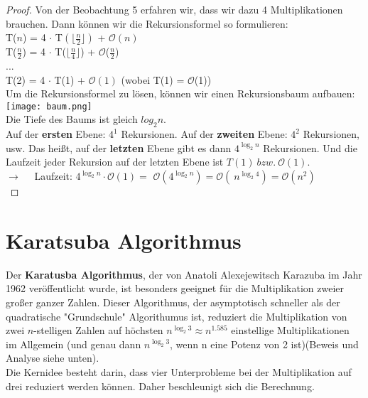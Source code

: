 \documentclass[11pt,a4paper, twoside]{article}
\theoremstyle{definition}
\begin{document}
\begin{proof}
Von der Beobachtung 5 erfahren wir, dass wir dazu 4 Multiplikationen brauchen. Dann können wir die Rekursionsformel so formulieren: \\
\quad		T($n$) = 4 $\cdot$ T$(\lfloor \frac{n}{2}\rfloor)$ + $\mathcal{O}(n)$\\
\quad		T($\frac{n}{2}$) = 4 $\cdot$ T($\lfloor \frac{n}{4}\rfloor$) + $\mathcal{O}$($\frac{n}{2}$)\\
\quad		...\\
\quad		T(2) = 4 $\cdot$ T(1) + $\mathcal{O}(1)$ \quad (wobei T(1) = $\mathcal{O}$(1))\\
Um die Rekursionsformel zu lösen, können wir einen Rekursionsbaum aufbauen: \\
\texttt{[image: baum.png]} \cite{3}\\
Die Tiefe des Baums ist gleich $log_{2}{n}$.\\
Auf der \textbf{ersten} Ebene: $4^{1}$ Rekursionen. Auf der \textbf{zweiten} Ebene: $4^{2}$ Rekursionen, usw. Das heißt, auf der \textbf{letzten} Ebene gibt es dann $4^{\log_2{n}}$ Rekursionen. Und die Laufzeit jeder Rekursion auf der letzten Ebene ist $T(1) \ bzw. \ \mathcal{O}(1)$.\\
$\rightarrow \quad$ Laufzeit: $4^{\log_{2}{n}} \cdot \mathcal{O}(1) = $ $ \mathcal{O}(4^{\log_{2}{n}}) = \mathcal{O}(\ n^{\log_{2}{4} }) = \mathcal{O} (n^{2})$\\
\end{proof}

\section{Karatsuba Algorithmus}
Der \textbf{Karatusba Algorithmus}, der von Anatoli Alexejewitsch Karazuba im Jahr 1962 veröffentlicht wurde, ist besonders geeignet für die Multiplikation zweier großer ganzer Zahlen. Dieser Algorithmus, der asymptotisch schneller als der quadratische "Grundschule"\- Algorithumus ist, reduziert die Multiplikation von zwei \(n\)-stelligen Zahlen auf höchsten $n^{\log_{2}{3}} \approx n^{1.585}$ einstellige Multiplikationen im Allgemein (und genau dann $n^{\log_{2}{3}}$, wenn n eine Potenz von 2 ist)(Beweis und Analyse siehe unten).\\

Die Kernidee besteht darin, dass vier Unterprobleme bei der Multiplikation auf drei reduziert werden können. Daher beschleunigt sich die Berechnung.
\\
\end{document}
